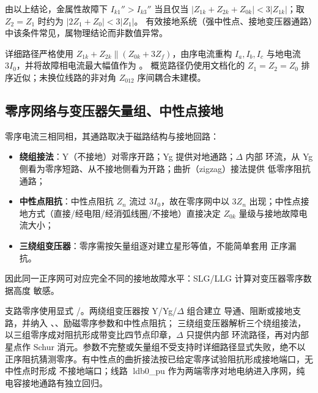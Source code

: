 \begin{remark}[单相电流可以超过三相]
由以上结论，金属性故障下 $I_{k1}''>I_{k3}''$ 当且仅当
$|Z_{1k}+Z_{2k}+Z_{0k}|<3|Z_{1k}|$；取 $Z_2=Z_1$ 时约为 $|2Z_1+Z_0|<3|Z_1|$。
有效接地系统（强中性点、接地变压器通路）中该条件常见，属物理结论而非数值异常。
\end{remark}

\begin{remark}[与详细实现的对应]
详细路径严格使用 $Z_{1k}+Z_{2k}\parallel(Z_{0k}+3Z_f)$，由序电流重构
$I_a,I_b,I_c$ 与地电流 $3I_0$，并将故障相电流最大幅值作为 。
概览路径仍使用文档化的 $Z_1=Z_2=Z_0$ 排序近似；未换位线路的非对角
$Z_{012}$ 序间耦合未建模。
\end{remark}

\subsection{零序网络与变压器矢量组、中性点接地}
零序电流三相同相，其通路取决于磁路结构与接地回路：
\begin{itemize}
  \item \textbf{绕组接法}：Y（不接地）对零序开路；Yg 提供对地通路；$\Delta$ 内部
        环流，从 Yg 侧看为零序短路、从不接地侧看为开路；曲折（zigzag）接法提供
        低零序阻抗通路；
  \item \textbf{中性点阻抗}：中性点阻抗 $Z_n$ 流过 $3I_0$，故在零序网中以 $3Z_n$
        出现；中性点接地方式（直接/经电阻/经消弧线圈/不接地）直接决定 $Z_{0k}$
        量级与接地故障电流大小；
  \item \textbf{三绕组变压器}：零序需按矢量组逐对建立星形等值，不能简单套用
        正序漏抗。
\end{itemize}
因此同一正序网可对应完全不同的接地故障水平：SLG/LLG 计算对变压器零序数据高度
敏感。

\begin{remark}[当前矢量组实现范围]
支路零序使用显式 /。两绕组变压器按 Y/Yg/$\Delta$ 组合建立
导通、阻断或接地支路，并纳入 、、励磁零序参数和中性点阻抗；
三绕组变压器解析三个绕组接法，以三组零序成对阻抗形成带变比四节点印章，$\Delta$ 只提供内部
环流路径，再对内部星点作 Schur 消元。参数不完整或矢量组不受支持时详细路径显式失败，绝不以
正序阻抗猜测零序。有中性点的曲折接法按已给定零序试验阻抗形成接地端口，无中性点时形成
不接地端口；线路 ld{b0\_pu} 作为两端零序对地电纳进入序网，纯电容接地通路有独立回归。
\end{remark}

